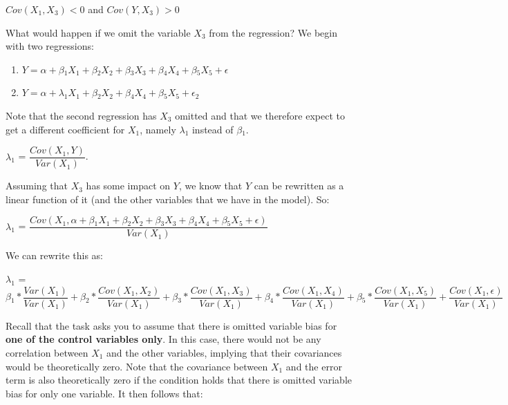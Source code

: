 \documentclass[12pt]{article}\usepackage[]{graphicx}\usepackage[]{color}
\begin{document}
\bigskip

$Cov(X_1, X_3) < 0$ and $Cov(Y, X_3) > 0$

\bigskip

What would happen if we omit the variable $X_3$ from the regression? We begin with two regressions:

\begin{enumerate}
  \item $ Y = \alpha + \beta{_1}X_1 + \beta{_2}X_2 + \beta{_3}X_3 + \beta{_4}X_4 + \beta{_5}X_5 + \epsilon$
  \item $ Y = \alpha + \lambda{_1}X_1 + \beta{_2}X_2 + \beta{_4}X_4 + \beta{_5}X_5 + \epsilon{_2}$
\end{enumerate}

\bigskip

Note that the second regression has $X_3$ omitted and that we therefore expect to get a different coefficient for $X_1$, namely  $\lambda{_1}$ instead of $\beta{_1}$.

\bigskip

$\lambda{_1}$ = $\dfrac{Cov(X_1,Y)}{Var(X_1)}$.

\bigskip

Assuming that $X_3$ has some impact on $Y$, we know that $Y$ can be rewritten as a linear function of it (and the other variables that we have in the model). So:

\bigskip

$\lambda{_1}$ = $\dfrac{Cov(X_1,\alpha + \beta{_1}X_1 + \beta{_2}X_2 + \beta{_3}X_3 + \beta{_4}X_4 + \beta{_5}X_5 + \epsilon)}{Var(X_1)}$

\bigskip

We can rewrite this as:

\bigskip

$\lambda{_1}$ = $\beta{_1}*\dfrac{Var(X_1)}{Var(X_1)} + \beta{_2}*\dfrac{Cov(X_1,X_2)}{Var(X_1)} + \beta{_3}*\dfrac{Cov(X_1,X_3)}{Var(X_1)} + \beta{_4}*\dfrac{Cov(X_1,X_4)}{Var(X_1)}  + \beta{_5}*\dfrac{Cov(X_1,X_5)}{Var(X_1)} + \dfrac{Cov(X_1,\epsilon)}{Var(X_1)}$

\bigskip

Recall that the task asks you to assume that there is omitted variable bias for \textbf{one of the control variables only}. In this case, there would not be any correlation between $X_1$ and the other variables, implying that their covariances would be theoretically zero. Note that the covariance between $X_1$ and the error term is also theoretically zero if the condition holds that there is omitted variable bias for only one variable. It then follows that:
\end{document}
